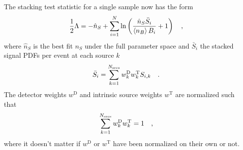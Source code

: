 The stacking test statistic for a single sample now has the form
\begin{align}
  \frac{1}{2}\Lambda
  = -\hat{n}_S + \sum_{i=1}^N \ln\left(\frac{\hat{n}_S\bar{S}_i}{\Braket{n_B} B_i} + 1\right) \quad\text{,}
\label{equ:TS}
\end{align}
where $\hat{n}_S$ is the best fit $n_S$ under the full parameter space and $\bar{S}_i$ the stacked signal PDFs per event at each source $k$
\begin{equation}
  \bar{S}_i = \sum_{k=1}^{N_\text{srcs}} w_k^\text{D} w_k^\text{T} S_{i,k} \quad\text{.}
\end{equation}
The detector weights $w^\text{D}$ and intrinsic source weights $w^\text{T}$ are normalized such that
\begin{equation}
  \sum_{k=1}^{N_\text{srcs}} w^\text{D}_k w^\text{T}_k = 1 \quad\text{,}
\end{equation}
where it doesn't matter if $w^\text{D}$ or $w^\text{T}$ have been normalized on their own or not.


